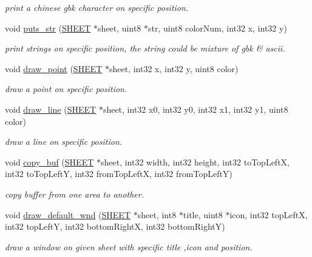 \begin{DoxyCompactItemize}
\begin{DoxyCompactList}\small\item\em print a chinese gbk character on specific position. \end{DoxyCompactList}\item 
void \hyperlink{group__graphic_gaad699d88e56a51e76de2e7d15d774418}{puts\+\_\+str} (\hyperlink{struct_s_h_e_e_t}{S\+H\+E\+E\+T} $\ast$sheet, uint8 $\ast$str, uint8 color\+Num, int32 x, int32 y)
\begin{DoxyCompactList}\small\item\em print strings on specific position, the string could be mixture of gbk \& ascii. \end{DoxyCompactList}\item 
void \hyperlink{group__graphic_gafb0e918ec3f47f523e177e16df122f83}{draw\+\_\+point} (\hyperlink{struct_s_h_e_e_t}{S\+H\+E\+E\+T} $\ast$sheet, int32 x, int32 y, uint8 color)
\begin{DoxyCompactList}\small\item\em draw a point on specific position. \end{DoxyCompactList}\item 
void \hyperlink{group__graphic_ga436a7be5f21a5aa13601c5e1915815b1}{draw\+\_\+line} (\hyperlink{struct_s_h_e_e_t}{S\+H\+E\+E\+T} $\ast$sheet, int32 x0, int32 y0, int32 x1, int32 y1, uint8 color)
\begin{DoxyCompactList}\small\item\em draw a line on specific position. \end{DoxyCompactList}\item 
void \hyperlink{group__graphic_gaa1b18235958f506c9c99597da1361f92}{copy\+\_\+buf} (\hyperlink{struct_s_h_e_e_t}{S\+H\+E\+E\+T} $\ast$sheet, int32 width, int32 height, int32 to\+Top\+Left\+X, int32 to\+Top\+Left\+Y, int32 from\+Top\+Left\+X, int32 from\+Top\+Left\+Y)
\begin{DoxyCompactList}\small\item\em copy buffer from one area to another. \end{DoxyCompactList}\item 
void \hyperlink{group__graphic_ga91771d8f5800b9458f3500c147646da5}{draw\+\_\+default\+\_\+wnd} (\hyperlink{struct_s_h_e_e_t}{S\+H\+E\+E\+T} $\ast$sheet, int8 $\ast$title, uint8 $\ast$icon, int32 top\+Left\+X, int32 top\+Left\+Y, int32 bottom\+Right\+X, int32 bottom\+Right\+Y)
\begin{DoxyCompactList}\small\item\em draw a window on given sheet with specific title ,icon and position. \end{DoxyCompactList}\item 

\end{DoxyCompactItemize}
